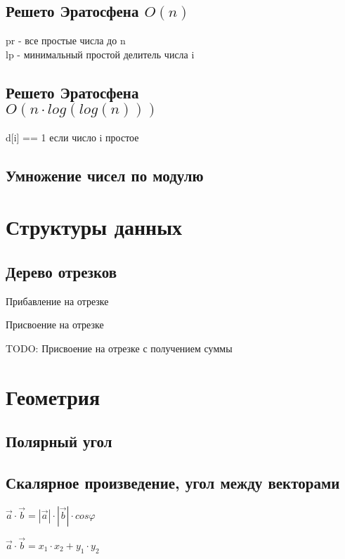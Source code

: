 \documentclass[a4paper]{article}
\begin{document}
\begin{multicols*}{2}
		\subsection{Решето Эратосфена $O(n)$}
		pr - все простые числа до n \\
		lp - минимальный простой делитель числа i
		
		\subsection{Решето Эратосфена \\ $O(n \cdot log(log(n)))$}
		d[i] == 1 если число i простое
		
		\subsection{Умножение чисел по модулю}
		
		
		\section{Структуры данных}
		\subsection{Дерево отрезков}
		
		 Прибавление на отрезке
		 
		 Присвоение на отрезке
		 
		 TODO: Присвоение на отрезке с получением суммы
		 
		 \section{Геометрия}
		 \subsection{Полярный угол}
		 
		 \subsection{Скалярное произведение, угол между векторами}
		 
		 $\vec a \cdot \vec b = |\vec a| \cdot |\vec b| \cdot cos \varphi$
		 
		 $\vec a \cdot \vec b = x_1 \cdot x_2 + y_1 \cdot y_2$
		 

\end{multicols*}
\end{document}
